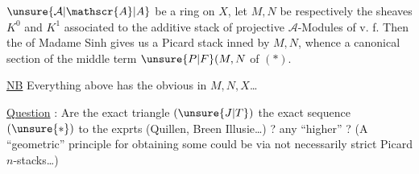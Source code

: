 
\uline{}\unsure{:|,}  $\unsure{\mathcal{A}|\mathscr{A}|A}$ be a ring on $X$, let $M,N$ be respectively the sheaves $K^{0}$ and $K^{1}$ associated to the additive stack of projective $\mathcal{A}$-Modules of v. f.  Then the  of Madame Sinh gives us a Picard stack inned by $M,N$, whence a canonical section  of the middle term $\unsure{P|F}(M,N$ of $(*)$.

\uline{NB} Everything above has the obvious  in $M,N,X$\ldots

\uline{Question} : Are the exact triangle $(\unsure{J|T})$  the exact sequence $(\unsure{*})$  to the exprts (Quillen, Breen Illusie\ldots) ?  any ``higher''  ? (A ``geometric'' principle for obtaining some could be via not necessarily strict Picard $n$-stacks\ldots)

